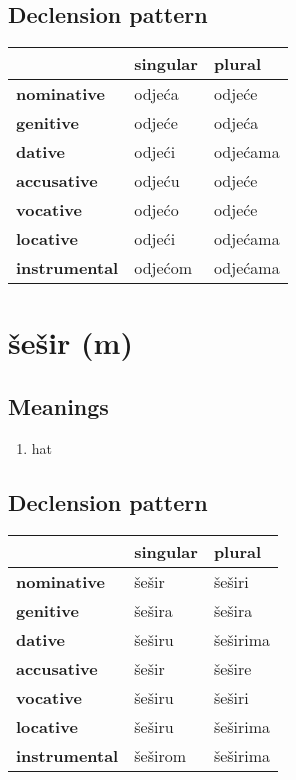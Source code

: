 \subsection*{Declension pattern}
\begin{tabularx}{\linewidth}{Xll}
\toprule
{} & singular &    plural \\
\midrule
\textbf{nominative  } &   odjeća &    odjeće \\
\textbf{genitive    } &   odjeće &    odjeća \\
\textbf{dative      } &   odjeći &  odjećama \\
\textbf{accusative  } &   odjeću &    odjeće \\
\textbf{vocative    } &   odjećo &    odjeće \\
\textbf{locative    } &   odjeći &  odjećama \\
\textbf{instrumental} &  odjećom &  odjećama \\
\bottomrule
\end{tabularx}

\filbreak
\section{šešir (m)}
\subsection*{Meanings}
\begin{enumerate}
\item hat
\end{enumerate}
\subsection*{Declension pattern}
\begin{tabularx}{\linewidth}{Xll}
\toprule
{} & singular &    plural \\
\midrule
\textbf{nominative  } &    šešir &    šeširi \\
\textbf{genitive    } &   šešira &    šešira \\
\textbf{dative      } &   šeširu &  šeširima \\
\textbf{accusative  } &    šešir &    šešire \\
\textbf{vocative    } &   šeširu &    šeširi \\
\textbf{locative    } &   šeširu &  šeširima \\
\textbf{instrumental} &  šeširom &  šeširima \\
\bottomrule
\end{tabularx}


